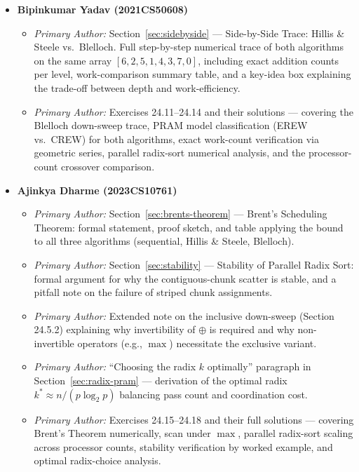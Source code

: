 \begin{itemize}[leftmargin=*]
  \item \textbf{Bipinkumar Yadav (2021CS50608)}
  \begin{itemize}
    \item \emph{Primary Author:} Section~\ref{sec:sidebyside} ---
          Side-by-Side Trace: Hillis \& Steele vs.\ Blelloch.
          Full step-by-step numerical trace of both algorithms on the
          same array $[6,2,5,1,4,3,7,0]$, including exact addition
          counts per level, work-comparison summary table, and a
          key-idea box explaining the trade-off between depth and
          work-efficiency.
    \item \emph{Primary Author:} Exercises 24.11--24.14 and their
          solutions --- covering the Blelloch down-sweep trace,
          PRAM model classification (EREW vs.\ CREW) for both
          algorithms, exact work-count verification via geometric
          series, parallel radix-sort numerical analysis, and the
          processor-count crossover comparison.
  \end{itemize}

  \item \textbf{Ajinkya Dharme (2023CS10761)}
  \begin{itemize}
    \item \emph{Primary Author:} Section~\ref{sec:brents-theorem} ---
          Brent's Scheduling Theorem: formal statement, proof sketch,
          and table applying the bound to all three algorithms
          (sequential, Hillis \& Steele, Blelloch).
    \item \emph{Primary Author:} Section~\ref{sec:stability} ---
          Stability of Parallel Radix Sort: formal argument for why
          the contiguous-chunk scatter is stable, and a pitfall note
          on the failure of striped chunk assignments.
    \item \emph{Primary Author:} Extended note on the inclusive
          down-sweep (Section 24.5.2) explaining why invertibility of
          $\oplus$ is required and why non-invertible operators
          (e.g., $\max$) necessitate the exclusive variant.
    \item \emph{Primary Author:} ``Choosing the radix $k$ optimally''
          paragraph in Section~\ref{sec:radix-pram} --- derivation of
          the optimal radix $k^* \approx n/(p \log_2 p)$ balancing
          pass count and coordination cost.
    \item \emph{Primary Author:} Exercises 24.15--24.18 and their full
          solutions --- covering Brent's Theorem numerically, scan
          under $\max$, parallel radix-sort scaling across processor
          counts, stability verification by worked example, and
          optimal radix-choice analysis.
  \end{itemize}
\end{itemize}
